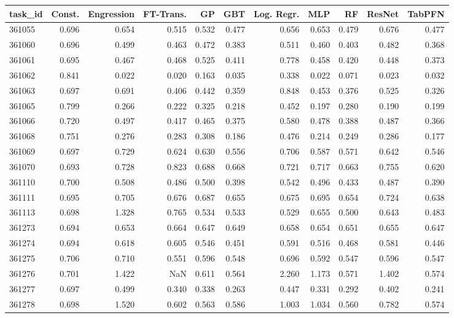 \begin{tabular}{lrrrrrrrrrr}
\toprule
task\_id & Const. & Engression & FT-Trans. & GP & GBT & Log. Regr. & MLP & RF & ResNet & TabPFN \\
\midrule
361055 & 0.696 & 0.654 & 0.515 & 0.532 & 0.477 & 0.656 & 0.653 & 0.479 & 0.676 & 0.477 \\
361060 & 0.696 & 0.499 & 0.463 & 0.472 & 0.383 & 0.511 & 0.460 & 0.403 & 0.482 & 0.368 \\
361061 & 0.695 & 0.467 & 0.468 & 0.525 & 0.411 & 0.778 & 0.458 & 0.420 & 0.448 & 0.373 \\
361062 & 0.841 & 0.022 & 0.020 & 0.163 & 0.035 & 0.338 & 0.022 & 0.071 & 0.023 & 0.032 \\
361063 & 0.697 & 0.691 & 0.406 & 0.442 & 0.359 & 0.848 & 0.453 & 0.376 & 0.525 & 0.326 \\
361065 & 0.799 & 0.266 & 0.222 & 0.325 & 0.218 & 0.452 & 0.197 & 0.280 & 0.190 & 0.199 \\
361066 & 0.720 & 0.497 & 0.417 & 0.465 & 0.375 & 0.580 & 0.478 & 0.388 & 0.487 & 0.366 \\
361068 & 0.751 & 0.276 & 0.283 & 0.308 & 0.186 & 0.476 & 0.214 & 0.249 & 0.286 & 0.177 \\
361069 & 0.697 & 0.729 & 0.624 & 0.630 & 0.556 & 0.706 & 0.587 & 0.571 & 0.642 & 0.546 \\
361070 & 0.693 & 0.728 & 0.823 & 0.688 & 0.668 & 0.721 & 0.717 & 0.663 & 0.755 & 0.620 \\
361110 & 0.700 & 0.508 & 0.486 & 0.500 & 0.398 & 0.542 & 0.496 & 0.433 & 0.487 & 0.390 \\
361111 & 0.695 & 0.705 & 0.676 & 0.687 & 0.655 & 0.675 & 0.695 & 0.654 & 0.724 & 0.638 \\
361113 & 0.698 & 1.328 & 0.765 & 0.534 & 0.533 & 0.529 & 0.655 & 0.500 & 0.643 & 0.483 \\
361273 & 0.694 & 0.653 & 0.664 & 0.647 & 0.649 & 0.658 & 0.654 & 0.651 & 0.655 & 0.647 \\
361274 & 0.694 & 0.618 & 0.605 & 0.546 & 0.451 & 0.591 & 0.516 & 0.468 & 0.581 & 0.446 \\
361275 & 0.706 & 0.710 & 0.551 & 0.596 & 0.548 & 0.696 & 0.592 & 0.547 & 0.596 & 0.547 \\
361276 & 0.701 & 1.422 & NaN & 0.611 & 0.564 & 2.260 & 1.173 & 0.571 & 1.402 & 0.574 \\
361277 & 0.697 & 0.499 & 0.340 & 0.338 & 0.263 & 0.447 & 0.331 & 0.292 & 0.402 & 0.241 \\
361278 & 0.698 & 1.520 & 0.602 & 0.563 & 0.586 & 1.003 & 1.034 & 0.560 & 0.782 & 0.574 \\

\end{tabular}
